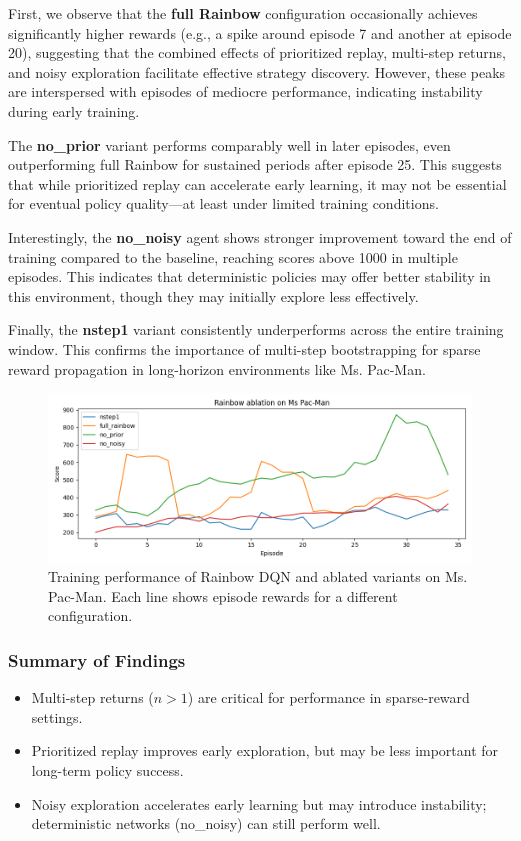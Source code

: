 \documentclass{article}
\begin{document}
First, we observe that the \textbf{full Rainbow} configuration occasionally achieves significantly higher rewards (e.g., a spike around episode 7 and another at episode 20), suggesting that the combined effects of prioritized replay, multi-step returns, and noisy exploration facilitate effective strategy discovery. However, these peaks are interspersed with episodes of mediocre performance, indicating instability during early training.

The \textbf{no\_prior} variant performs comparably well in later episodes, even outperforming full Rainbow for sustained periods after episode 25. This suggests that while prioritized replay can accelerate early learning, it may not be essential for eventual policy quality—at least under limited training conditions.

Interestingly, the \textbf{no\_noisy} agent shows stronger improvement toward the end of training compared to the baseline, reaching scores above 1000 in multiple episodes. This indicates that deterministic policies may offer better stability in this environment, though they may initially explore less effectively.

Finally, the \textbf{nstep1} variant consistently underperforms across the entire training window. This confirms the importance of multi-step bootstrapping for sparse reward propagation in long-horizon environments like Ms. Pac-Man.

\begin{figure}[h]
    \centering
    \includegraphics[width=\linewidth]{rainbow_ablation_smooth.png}
    \caption{Training performance of Rainbow DQN and ablated variants on Ms. Pac-Man. Each line shows episode rewards for a different configuration.}
    \label{fig:rainbow_ablation}
\end{figure}

\subsubsection*{Summary of Findings}
\begin{itemize}
    \item Multi-step returns ($n > 1$) are critical for performance in sparse-reward settings.
    \item Prioritized replay improves early exploration, but may be less important for long-term policy success.
    \item Noisy exploration accelerates early learning but may introduce instability; deterministic networks (no\_noisy) can still perform well.
\end{itemize}
\end{document}

